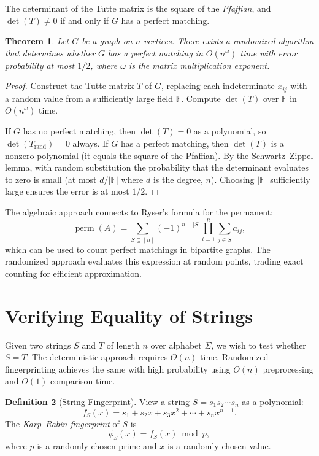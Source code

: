 \documentclass[twoside,12pt]{book}
\theoremstyle{plain}
\newtheorem{theorem}{Theorem}[chapter]
\theoremstyle{definition}
\newtheorem{definition}[theorem]{Definition}
\theoremstyle{remark}
\begin{document}
The determinant of the Tutte matrix is the square of the \emph{Pfaffian}, and $\det(T) \neq 0$ if and only if $G$ has a perfect matching.

\begin{theorem}
\label{thm:perfect-matching}
Let $G$ be a graph on $n$ vertices. There exists a randomized algorithm that determines whether $G$ has a perfect matching in $O(n^\omega)$ time with error probability at most $1/2$, where $\omega$ is the matrix multiplication exponent.
\end{theorem}

\begin{proof}
Construct the Tutte matrix $T$ of $G$, replacing each indeterminate $x_{ij}$ with a random value from a sufficiently large field $\mathbb{F}$. Compute $\det(T)$ over $\mathbb{F}$ in $O(n^\omega)$ time.

If $G$ has no perfect matching, then $\det(T) = 0$ as a polynomial, so $\det(T_{\text{rand}}) = 0$ always. If $G$ has a perfect matching, then $\det(T)$ is a nonzero polynomial (it equals the square of the Pfaffian). By the Schwartz--Zippel lemma, with random substitution the probability that the determinant evaluates to zero is small (at most $d/|\mathbb{F}|$ where $d$ is the degree, $n$). Choosing $|\mathbb{F}|$ sufficiently large ensures the error is at most $1/2$.
\end{proof}

The algebraic approach connects to Ryser's formula for the permanent:
\[
\operatorname{perm}(A) = \sum_{S \subseteq [n]} (-1)^{n - |S|} \prod_{i=1}^{n} \sum_{j \in S} a_{ij},
\]
which can be used to count perfect matchings in bipartite graphs. The randomized approach evaluates this expression at random points, trading exact counting for efficient approximation.


\section{Verifying Equality of Strings}
\label{sec:string-equality}

Given two strings $S$ and $T$ of length $n$ over alphabet $\Sigma$, we wish to test whether $S = T$. The deterministic approach requires $\Theta(n)$ time. Randomized fingerprinting achieves the same with high probability using $O(n)$ preprocessing and $O(1)$ comparison time.

\begin{definition}[String Fingerprint]
View a string $S = s_1 s_2 \cdots s_n$ as a polynomial:
\[
f_S(x) = s_1 + s_2 x + s_3 x^2 + \cdots + s_n x^{n-1}.
\]
The \emph{Karp--Rabin fingerprint} of $S$ is
\[
\phi_S(x) = f_S(x) \bmod p,
\]
where $p$ is a randomly chosen prime and $x$ is a randomly chosen value.
\end{definition}
\end{document}
